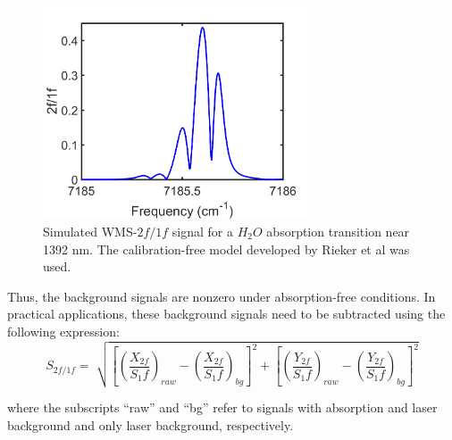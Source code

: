  \begin{figure}[h]
    \centering
        \includegraphics[width=0.7\textwidth]{fig/ch3_fig2.png}
        \caption{Simulated WMS-$2f/1f$ signal for a $H_2O$ absorption transition near 1392 nm. The calibration-free model developed by Rieker et al \cite{rieker2009calibration} was used.}
    \label{fig:ch3_1}
\end{figure}

Thus, the background signals are nonzero under absorption-free conditions. In practical applications, these background signals need to be subtracted using the following expression:
\begin{equation}
S_{2f/1f}=\sqrt[]{\left[\left(\frac{X_{2f}}{S_1f}\right)_{raw}-\left(\frac{X_{2f}}{S_1f}\right)_{bg}\right]^2+\left[\left(\frac{Y_{2f}}{S_1f}\right)_{raw}-\left(\frac{Y_{2f}}{S_1f}\right)_{bg}\right]^2}
\end{equation}

\noindent where the subscripts ``raw'' and ``bg'' refer to signals with absorption and laser background and only laser background, respectively.

